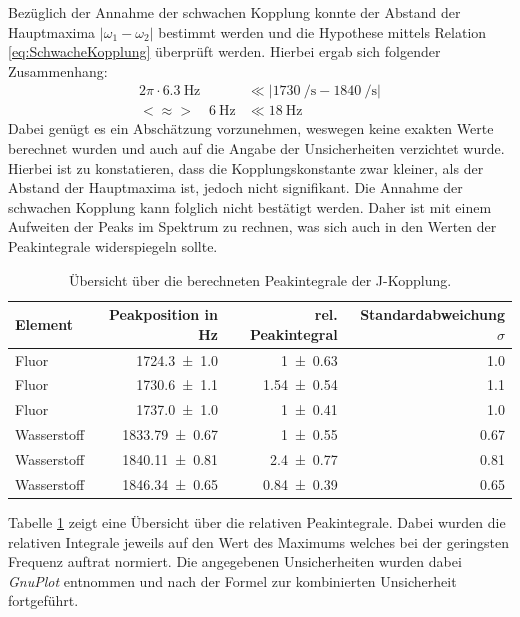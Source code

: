 Bezüglich der Annahme der schwachen Kopplung konnte der Abstand der Hauptmaxima $\vert \omega_1 - \omega_2 \vert$ bestimmt werden und die Hypothese mittels Relation \eqref{eq:SchwacheKopplung} überprüft werden.
Hierbei ergab sich folgender Zusammenhang:
\begin{align*}
    2 \pi \cdot \SI{6.3}{\hertz} &\ll \vert \SI{1730}{\per \second} - \SI{1840}{\per \second} \vert \\
    <\approx > \quad \SI{6}{\hertz} &\ll \SI{18}{\hertz}
\end{align*}
Dabei genügt es ein Abschätzung vorzunehmen, weswegen keine exakten Werte berechnet wurden und auch auf die Angabe der Unsicherheiten verzichtet wurde.
Hierbei ist zu konstatieren, dass die Kopplungskonstante zwar kleiner, als der Abstand der Hauptmaxima ist, jedoch nicht signifikant.
Die Annahme der schwachen Kopplung kann folglich nicht bestätigt werden.
Daher ist mit einem Aufweiten der Peaks im Spektrum zu rechnen, was sich auch in den Werten der Peakintegrale widerspiegeln sollte.
\begin{table}[H]
    \centering
    \caption{Übersicht über die berechneten Peakintegrale der J-Kopplung.}
    \begin{tabular}{|l||r|r|r|} \hline
        Element & Peakposition in \si{\hertz} & rel. Peakintegral & Standardabweichung $\sigma$ \\ \hline \hline
        Fluor & \SI{1724.3 \pm 1.0}{} & \SI{1 \pm 0.63}{} & \SI{1.0}{}\\ \hline
        Fluor & \SI{1730.6 \pm 1.1}{}& \SI{1.54 \pm 0.54}{} & \SI{1.1}{}\\ \hline
        Fluor & \SI{1737.0 \pm 1.0}{} &\SI{1 \pm 0.41}{}& \SI{1.0}{}\\ \hline \hline
        Wasserstoff & \SI{1833.79 \pm 0.67}{} & \SI{1 \pm 0.55}{}& \SI{0.67}{}\\ \hline
        Wasserstoff & \SI{1840.11 \pm 0.81}{} & \SI{2.4 \pm 0.77}{}& \SI{0.81}{}\\ \hline
        Wasserstoff & \SI{1846.34 \pm 0.65}{}  & \SI{0.84 \pm 0.39}{}& \SI{0.65}{}\\ \hline
    \end{tabular} 
    \label{tab:Peaksintens} 
\end{table}
Tabelle \ref{tab:Peaksintens} zeigt eine Übersicht über die relativen Peakintegrale.
Dabei wurden die relativen Integrale jeweils auf den Wert des Maximums welches bei der geringsten Frequenz auftrat normiert.
Die angegebenen Unsicherheiten wurden dabei \textit{GnuPlot} entnommen und nach der Formel zur kombinierten Unsicherheit fortgeführt.
